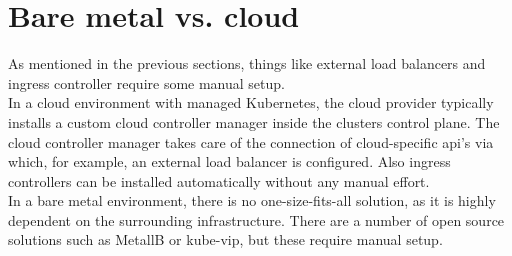 \section{Bare metal vs. cloud}

As mentioned in the previous sections, things like external load balancers and ingress controller require some manual setup.
\\
In a cloud environment with managed Kubernetes, the cloud provider typically installs a custom cloud controller manager inside the clusters control plane.
The cloud controller manager takes care of the connection of cloud-specific api's via which, for example, an external load balancer is configured.
Also ingress controllers can be installed automatically without any manual effort.
\\
In a bare metal environment, there is no one-size-fits-all solution, as it is highly dependent on the surrounding infrastructure.
There are a number of open source solutions such as MetallB or kube-vip, but these require manual setup.
